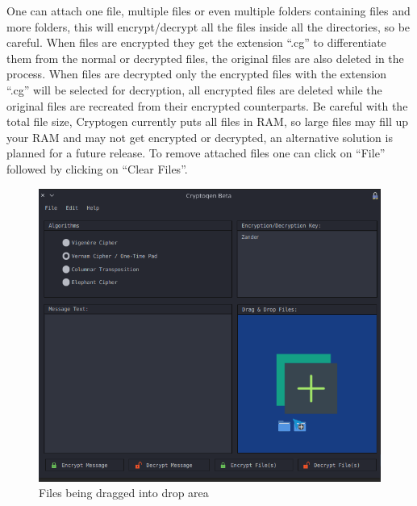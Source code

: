 \documentclass[11pt]{article}
\begin{document}
	 One can attach one file, multiple files or even multiple folders containing files and more folders, this will encrypt/decrypt all the files inside all the directories, so be careful. When files are encrypted they get the extension ``.cg'' to differentiate them from the normal or decrypted files, the original files are also deleted in the process. When files are decrypted only the encrypted files with the extension ``.cg'' will be selected for decryption, all encrypted files are deleted while the original files are recreated from their encrypted counterparts. Be careful with the total file size, Cryptogen currently puts all files in RAM, so large files may fill up your RAM and may not get encrypted or decrypted, an alternative solution is planned for a future release. To remove attached files one can click on ``File'' followed by clicking on ``Clear Files''.

	 \vspace{4cm}
	\begin{figure}[!htb]
	\centering
	\includegraphics[scale=0.55]{dragndrop.png}
	\caption{Files being dragged into drop area} %
	\label{fig:dragndrop} %
	\end{figure}
\end{document}
